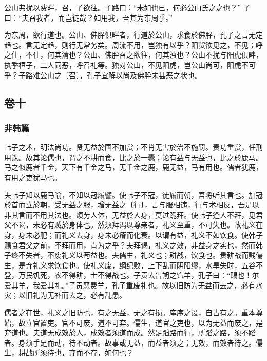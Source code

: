 \documentclass[]{article}
\begin{document}
公山弗扰以费畔，召，子欲往。子路曰：``未如也已，何必公山氏之之也？''
子曰：``夫召我者，而岂徒哉？如用我，吾其为东周乎。''

为东周，欲行道也。公山、佛肸俱畔者，行道於公山，求食於佛肸，孔子之言无定趋也。言无定趋，则行无常务矣。周流不用，岂独有以乎？阳货欲见之，不见；呼之仕，不仕，何其清也？公山、佛肸召之欲往，何其浊也？公山不扰与阳虎俱畔，执季桓子，二人同恶，呼召礼等。独对公山，不见阳虎，岂公山尚可，阳虎不可乎？子路难公山之〔召〕，孔子宜解以尚及佛肸未甚恶之状也。

\hypertarget{header-n425}{%
\subsection{卷十}\label{header-n425}}

\hypertarget{header-n426}{%
\subsubsection{非韩篇}\label{header-n426}}

韩子之术，明法尚功。贤无益於国不加赏；不肖无害於治不施罚。责功重赏，任刑用诛。故其论儒也，谓之不耕而食，比之於一蠹；论有益与无益也，比之於鹿马。马之似鹿者千金，天下有千金之马，无千金之鹿，鹿无益，马有用也。儒者犹鹿，有用之吏犹马也。

夫韩子知以鹿马喻，不知以冠履譬。使韩子不冠，徒履而朝，吾将听其言也。加冠於首而立於朝，受无益之服，增无益之〔行〕，言与服相违，行与术相反，吾是以非其言而不用其法也。烦劳人体，无益於人身，莫过跪拜。使韩子逢人不拜，见君父不谒，未必有贼於身体也。然须拜谒以尊亲者，礼义至重，不可失也。故礼义在身，身未必肥；而礼义去身，身未必瘠而化衰。以谓有益，礼义不如饮食。使韩子赐食君父之前，不拜而用，肯为之乎？夫拜谒，礼义之效，非益身之实也，然而韩子终不失者，不废礼义以苟益也。夫儒生，礼义也；耕战，饮食也。贵耕战而贱儒生，是弃礼义求饮食也。使礼义废，纲纪败，上下乱而阴阳缪，水旱失时，五谷不登，万民饥死，农不得耕，士不得战也。子贡去告朔之饩羊，孔子曰：``赐也！尔爱其羊，我爱其礼。''子贡恶费羊，孔子重废礼也。故以旧防为无益而去之，必有水灾；以旧礼为无补而去之，必有乱患。

儒者之在世，礼义之旧防也，有之无益，无之有损。庠序之设，自古有之。重本尊始，故立官置吏。官不可废，道不可弃。儒生，道官之吏也，以为无益而废之，是弃道也。夫道无成效於人，成效者须道而成。然足蹈路而行，所蹈之路，须不蹈者。身须手足而动，待不动者。故事或无益，而益者须之；无效，而效者待之。儒生，耕战所须待也，弃而不存，如何也？
\end{document}

